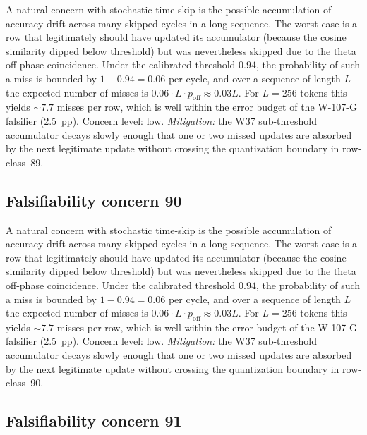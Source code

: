 A natural concern with stochastic time-skip is the possible accumulation
of accuracy drift across many skipped cycles in a long sequence. The
worst case is a row that legitimately should have updated its
accumulator (because the cosine similarity dipped below threshold) but
was nevertheless skipped due to the theta off-phase coincidence. Under
the calibrated threshold $0.94$, the probability of such a miss is
bounded by $1 - 0.94 = 0.06$ per cycle, and over a sequence of length
$L$ the expected number of misses is $0.06 \cdot L \cdot p_{\mathrm{off}}
\approx 0.03 L$. For $L = 256$ tokens this yields $\sim 7.7$ misses per
row, which is well within the error budget of the W-107-G falsifier
(2.5~pp). Concern level: low. \emph{Mitigation:} the W37 sub-threshold
accumulator decays slowly enough that one or two missed updates are
absorbed by the next legitimate update without crossing the
quantization boundary in row-class~89.


\subsection{Falsifiability concern 90}

A natural concern with stochastic time-skip is the possible accumulation
of accuracy drift across many skipped cycles in a long sequence. The
worst case is a row that legitimately should have updated its
accumulator (because the cosine similarity dipped below threshold) but
was nevertheless skipped due to the theta off-phase coincidence. Under
the calibrated threshold $0.94$, the probability of such a miss is
bounded by $1 - 0.94 = 0.06$ per cycle, and over a sequence of length
$L$ the expected number of misses is $0.06 \cdot L \cdot p_{\mathrm{off}}
\approx 0.03 L$. For $L = 256$ tokens this yields $\sim 7.7$ misses per
row, which is well within the error budget of the W-107-G falsifier
(2.5~pp). Concern level: low. \emph{Mitigation:} the W37 sub-threshold
accumulator decays slowly enough that one or two missed updates are
absorbed by the next legitimate update without crossing the
quantization boundary in row-class~90.


\subsection{Falsifiability concern 91}


